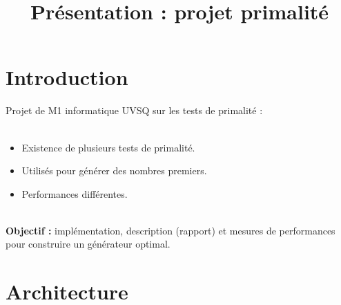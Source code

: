 
\usepackage[french,frenchkw,ruled,vlined]{../texLib/algorithm2e}
\usepackage{../texLib/myInfolines}
\usepackage{longtable,array}
\title{Présentation : projet primalité}




	\begin{frame}
		\titlepage
	\end{frame}
	
	\section*{Introduction}
	
		\begin{frame}
			Projet de M1 informatique UVSQ sur les tests de primalité :\\~\\
			\begin{itemize}
				\item Existence de plusieurs tests de primalité.
				\item Utilisés pour générer des nombres premiers.
				\item Performances différentes.
			\end{itemize}~\\
			\pause
			\textbf{Objectif :} implémentation, description (rapport) et mesures de performances pour construire un générateur optimal.\\
		\end{frame}
	
		\begin{frame}
			\tableofcontents
		\end{frame}
		
	\section{Architecture}
	
